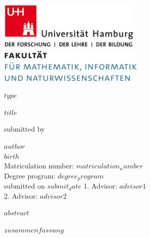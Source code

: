 \documentclass[a4paper,12pt]{article}
\begin{document}
\thispagestyle{empty}

\begin{titlepage}

\includegraphics[width=6.8cm]{images/uhh_logo.png}
\hspace{2cm}
\includegraphics[width=7cm]{images/min_logo.png}

\begin{center}\Large
  \vfill
	$type$
	\vfill
	\makeatletter
	{\LARGE\textsf{\textbf{$title$}}\par}
	\makeatother
	\vfill
  submitted by \\\vspace{0.5cm}
  \par\bigskip
	\makeatletter
  \textbf{$author$} \\
  \makeatother
  $birth$ \\
  Matriculation number: $matriculation_number$ \\
  Degree program: $degree_program$ \\
  \vfill
	\makeatletter
	submitted on $submit_date$
	\makeatother
	\vfill
  1. Advisor: $advisor1$ \\
  2. Advisor: $advisor2$ \\

\end{center}
\end{titlepage}


\newpage
$abstract$
\pagestyle{plain}
\setcounter{page}{1}    				%

\newpage
$zusammenfassung$

\newpage
\renewcommand{\contentsname}{Table of Content}
\tableofcontents
\clearpage
\end{document}
